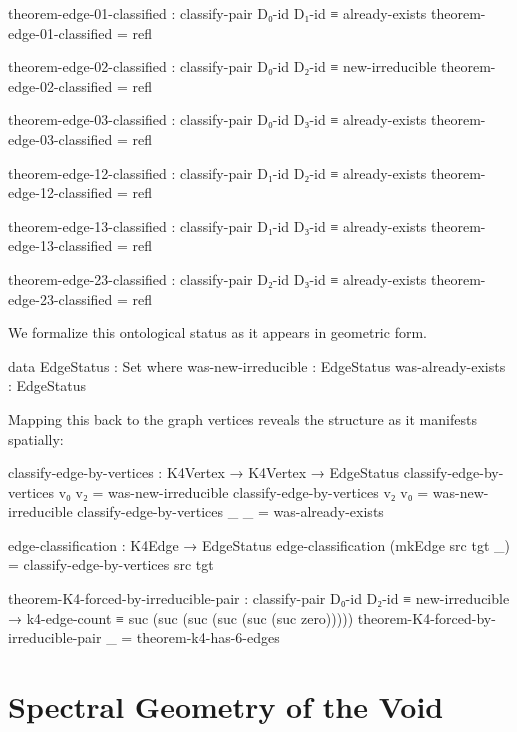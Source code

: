 \documentclass[11pt,a4paper]{book}
\begin{document}
\begin{code}
theorem-edge-01-classified : classify-pair D₀-id D₁-id ≡ already-exists
theorem-edge-01-classified = refl

theorem-edge-02-classified : classify-pair D₀-id D₂-id ≡ new-irreducible
theorem-edge-02-classified = refl

theorem-edge-03-classified : classify-pair D₀-id D₃-id ≡ already-exists
theorem-edge-03-classified = refl

theorem-edge-12-classified : classify-pair D₁-id D₂-id ≡ already-exists
theorem-edge-12-classified = refl

theorem-edge-13-classified : classify-pair D₁-id D₃-id ≡ already-exists
theorem-edge-13-classified = refl

theorem-edge-23-classified : classify-pair D₂-id D₃-id ≡ already-exists
theorem-edge-23-classified = refl

\end{code}

We formalize this ontological status as it appears in geometric form.

\begin{code}
data EdgeStatus : Set where
  was-new-irreducible : EdgeStatus
  was-already-exists  : EdgeStatus

\end{code}

Mapping this back to the graph vertices reveals the structure as it manifests spatially:

\begin{code}
classify-edge-by-vertices : K4Vertex → K4Vertex → EdgeStatus
classify-edge-by-vertices v₀ v₂ = was-new-irreducible
classify-edge-by-vertices v₂ v₀ = was-new-irreducible
classify-edge-by-vertices _ _ = was-already-exists

edge-classification : K4Edge → EdgeStatus
edge-classification (mkEdge src tgt _) = classify-edge-by-vertices src tgt

\end{code}

\begin{code}
theorem-K4-forced-by-irreducible-pair : 
  classify-pair D₀-id D₂-id ≡ new-irreducible →
  k4-edge-count ≡ suc (suc (suc (suc (suc (suc zero)))))
theorem-K4-forced-by-irreducible-pair _ = theorem-k4-has-6-edges
\end{code}

\section{Spectral Geometry of the Void}
\end{document}
